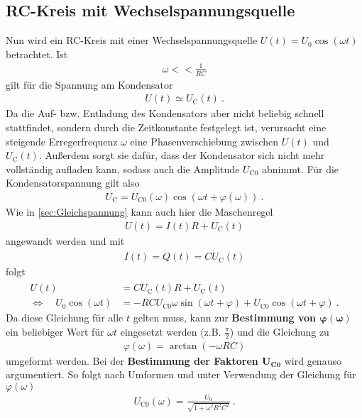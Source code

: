 \subsection{RC-Kreis mit Wechselspannungsquelle}
Nun wird ein RC-Kreis mit einer Wechselspannungsquelle $U(t) = U_0\cos(\omega t)$ betrachtet. Ist
\begin{align}
	\omega << \frac{1}{RC}
\end{align}
gilt für die Spannung am Kondensator
\begin{align}
	U(t) \simeq U_\text{C}(t) \ .
\end{align}
Da die Auf- bzw. Entladung des Kondensators aber nicht beliebig schnell stattfindet, sondern durch die Zeitkonstante festgelegt ist, verursacht eine steigende Erregerfrequenz $\omega$ eine Phasenverschiebung zwischen $U(t)$ und $U_\text{C}(t)$. Außerdem sorgt sie dafür, dass der Kondensator sich nicht mehr vollständig aufladen kann, sodass auch die Amplitude $U_{\text{C}0}$ abnimmt. Für die Kondensatorspannung gilt also
\begin{align}
	U_\text{C} = U_{\text{C}0}(\omega)\cos(\omega t + \varphi(\omega)) \ .
\end{align}
Wie in \ref{sec:Gleichspannung} kann auch hier die Maschenregel
\begin{align}\label{Maschenregel}
	U(t) = I(t)R + U_\text{C}(t)
\end{align}
angewandt werden und mit
\begin{align}
	I(t) = \dot{Q}(t) = C\dot{U}_\text{C}(t)
\end{align}
folgt
\begin{align}\label{Maschenregel_DGL}
	U(t) &= C\dot{U}_\text{C}(t)R + U_\text{C}(t) \\
	\Leftrightarrow\quad U_0\cos(\omega t) &= -RCU_{\text{C}0}\omega\sin(\omega t + \varphi) + U_{\text{C}0}\cos(\omega t + \varphi) \ .
\end{align}
Da diese Gleichung für alle $t$ gelten muss, kann zur \textbf{Bestimmung von $\bm{\varphi(\omega)}$} ein beliebiger Wert für $\omega t$ eingesetzt werden (z.B. $\frac{\pi}{2}$) und die Gleichung zu
\begin{align}
	\varphi(\omega) = \arctan(-\omega RC)
\end{align}
umgeformt werden. Bei der \textbf{Bestimmung der Faktoren $\bm{U_{\text{C}0}}$} wird genauso argumentiert. So folgt nach Umformen und unter Verwendung der Gleichung für $\varphi(\omega)$
\begin{align}
	U_{\text{C}0}(\omega) = \frac{U_0}{\sqrt{1+\omega^2R^2C^2}} \ .
\end{align} \\
